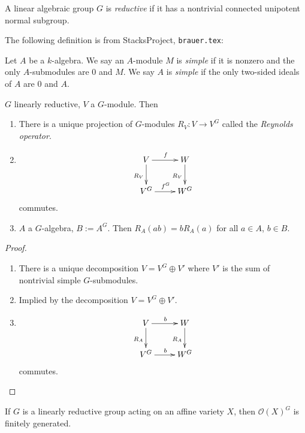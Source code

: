 \begin{definition}
\label{definition-reductive-linear-algebraic-group}
A linear algebraic group $G$ is {\it reductive} if it has a nontrivial connected
unipotent normal subgroup.
\end{definition}

The following definition is from StacksProject, \texttt{brauer.tex}:

\begin{definition}
\label{definition-simple}
Let $A$ be a $k$-algebra.
We say an $A$-module $M$ is {\it simple} if it is nonzero and
the only $A$-submodules are $0$ and $M$.
We say $A$ is {\it simple} if the only two-sided ideals of $A$ are
$0$ and $A$.
\end{definition}

\begin{lemma}
\label{lemma-Reynolds-operator}
$G$ linearly reductive, $V$ a $G$-module. Then
\begin{enumerate}
\item There is a unique projection of $G$-modules $R_V:V \to V^G$ called the
{\it Reynolds operator}.
\item 
$$
\xymatrix{
V\ar[d]_{R_V}\ar[r]^f&  W\ar[d]_{R_V}\\
V^G\ar[r]^{f^G}&W^G
}
$$
commutes.
\item $A$ a $G$-algebra, $B:=A^G$. Then $R_A(ab)=bR_A(a)$ for all $a \in A$, $b
\in B$.
\end{enumerate}
\end{lemma}

\begin{proof}
\begin{enumerate}
\item There is a unique decomposition $V=V^G \oplus V'$ where $V'$ is the sum of
nontrivial simple $G$-submodules.
\item Implied by the decomposition $V=V^G \oplus V'$.
\item 
$$
\xymatrix{
V\ar[d]_{R_A}\ar[r]^b&  W\ar[d]_{R_A}\\
V^G\ar[r]^{b}&W^G
}
$$
commutes.
\end{enumerate}
\end{proof}

\begin{theorem}
\label{theorem-linearly-reductive-action-
implies-invariant-sections-finitely-generated}
If $G$ is a linearly reductive group acting on an affine variety $X$, then
$\mathcal{O}(X)^G$ is finitely generated.
\end{theorem}

